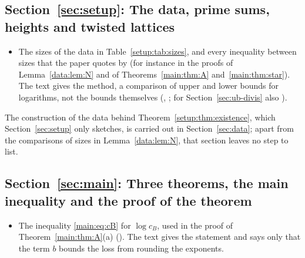 \subsection*{Section~\ref{sec:setup}: The data, prime sums, heights and twisted lattices}
\begin{itemize}[leftmargin=2em,itemsep=1pt]
\item The sizes of the data in Table~\ref{setup:tab:sizes}, and every inequality between sizes that
  the paper quotes by  (for instance in the proofs of
  Lemma~\ref{data:lem:N} and of Theorems~\ref{main:thm:A} and~\ref{main:thm:star}). The text gives
  the method, a comparison of upper and lower bounds for logarithms, not the bounds themselves
  (, ; for
  Section~\ref{sec:ub-divis} also ).
\end{itemize}
The construction of the data behind Theorem~\ref{setup:thm:existence}, which
Section~\ref{sec:setup} only sketches, is carried out in Section~\ref{sec:data}; apart from the
comparisons of sizes in Lemma~\ref{data:lem:N}, that section leaves no step to list.

\subsection*{Section~\ref{sec:main}: Three theorems, the main inequality and the proof of the theorem}
\begin{itemize}[leftmargin=2em,itemsep=1pt]
\item The inequality \eqref{main:eq:cB} for $\log c_B$, used in the proof of
  Theorem~\ref{main:thm:A}(a) (). The text gives the statement
  and says only that the term $b$ bounds the loss from rounding the exponents.
\end{itemize}

